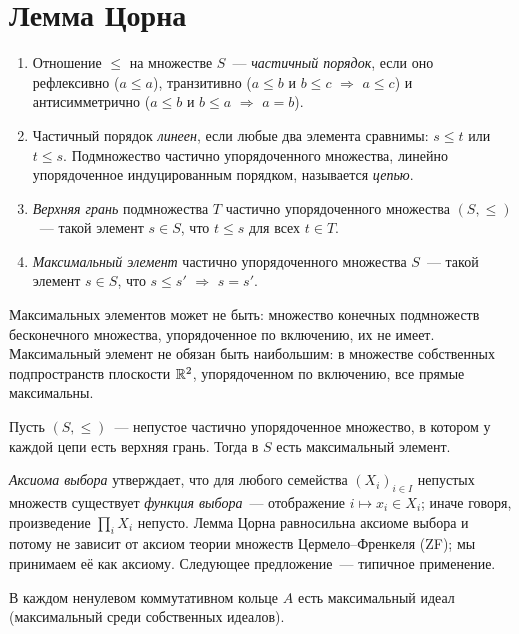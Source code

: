 \section{Лемма Цорна}

\begin{definition}[6.1]
\begin{enumerate}[label=(\alph*)]
\item Отношение $\le$ на множестве $S$~--- \emph{частичный порядок}, если оно рефлексивно ($a\le a$), транзитивно
($a\le b$ и $b\le c$ $\Rightarrow$ $a\le c$) и антисимметрично ($a\le b$ и $b\le a$ $\Rightarrow$ $a=b$).
\item Частичный порядок \emph{линеен}, если любые два элемента сравнимы: $s\le t$ или $t\le s$. Подмножество
частично упорядоченного множества, линейно упорядоченное индуцированным порядком, называется \emph{цепью}.
\item \emph{Верхняя грань} подмножества $T$ частично упорядоченного множества $(S,\le)$~--- такой элемент $s\in S$,
что $t\le s$ для всех $t\in T$.
\item \emph{Максимальный элемент} частично упорядоченного множества $S$~--- такой элемент $s\in S$, что
$s\le s'$ $\Rightarrow$ $s=s'$.
\end{enumerate}
\end{definition}

Максимальных элементов может не быть: множество конечных подмножеств бесконечного множества, упорядоченное по
включению, их не имеет. Максимальный элемент не обязан быть наибольшим: в множестве собственных подпространств
плоскости $\mathbb R^2$, упорядоченном по включению, все прямые максимальны.

\begin{lemma}
Пусть $(S,\le)$~--- непустое частично упорядоченное множество, в котором у каждой цепи есть верхняя грань. Тогда в $S$
есть максимальный элемент.
\end{lemma}

\emph{Аксиома выбора} утверждает, что для любого семейства $(X_i)_{i\in I}$ непустых множеств существует
\emph{функция выбора}~--- отображение $i\mapsto x_i\in X_i$; иначе говоря, произведение $\prod_iX_i$ непусто. Лемма
Цорна равносильна аксиоме выбора и потому не зависит от аксиом теории множеств Цермело--Френкеля (ZF); мы принимаем её
как аксиому. Следующее предложение~--- типичное применение.

\begin{proposition}[6.3]
В каждом ненулевом коммутативном кольце $A$ есть максимальный идеал (максимальный среди собственных идеалов).
\end{proposition}

